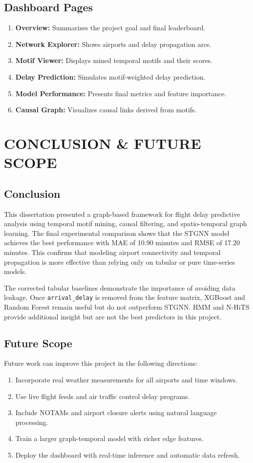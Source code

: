 \documentclass[12pt,a4paper]{report}
\begin{document}
\section{Dashboard Pages}
\begin{enumerate}
	\item \textbf{Overview:} Summarizes the project goal and final leaderboard.
	\item \textbf{Network Explorer:} Shows airports and delay propagation arcs.
	\item \textbf{Motif Viewer:} Displays mined temporal motifs and their scores.
	\item \textbf{Delay Prediction:} Simulates motif-weighted delay prediction.
	\item \textbf{Model Performance:} Presents final metrics and feature importance.
	\item \textbf{Causal Graph:} Visualizes causal links derived from motifs.
\end{enumerate}

\chapter{CONCLUSION \& FUTURE SCOPE}
\noindent{\rule{\textwidth}{1.5pt}}

\section{Conclusion}
This dissertation presented a graph-based framework for flight delay predictive analysis using temporal motif mining, causal filtering, and spatio-temporal graph learning. The final experimental comparison shows that the STGNN model achieves the best performance with MAE of 10.90 minutes and RMSE of 17.20 minutes. This confirms that modeling airport connectivity and temporal propagation is more effective than relying only on tabular or pure time-series models.

The corrected tabular baselines demonstrate the importance of avoiding data leakage. Once \texttt{arrival\_delay} is removed from the feature matrix, XGBoost and Random Forest remain useful but do not outperform STGNN. HMM and N-HiTS provide additional insight but are not the best predictors in this project.

\section{Future Scope}
Future work can improve this project in the following directions:
\begin{enumerate}
	\item Incorporate real weather measurements for all airports and time windows.
	\item Use live flight feeds and air traffic control delay programs.
	\item Include NOTAMs and airport closure alerts using natural language processing.
	\item Train a larger graph-temporal model with richer edge features.
	\item Deploy the dashboard with real-time inference and automatic data refresh.
\end{enumerate}
\end{document}
